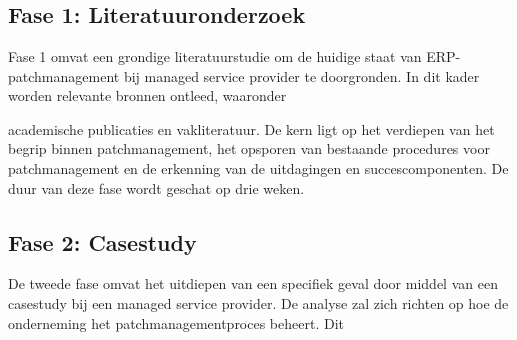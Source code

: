 
\chapter{}%
\label{ch:methodologie}



\section{Fase 1: Literatuuronderzoek}
Fase 1 omvat een grondige literatuurstudie om de huidige staat van ERP-patchmanagement bij managed service provider te doorgronden. In dit kader worden relevante bronnen ontleed, waaronder 

academische publicaties en vakliteratuur. De kern ligt op het verdiepen van het begrip binnen patchmanagement, het opsporen van bestaande procedures voor patchmanagement en de erkenning van de uitdagingen en succescomponenten. De duur van deze fase wordt geschat op drie weken.
\section{Fase 2: Casestudy}
De tweede fase omvat het uitdiepen van een specifiek geval door middel van een casestudy bij een managed service provider. De analyse zal zich richten op hoe de onderneming het patchmanagementproces beheert. Dit

